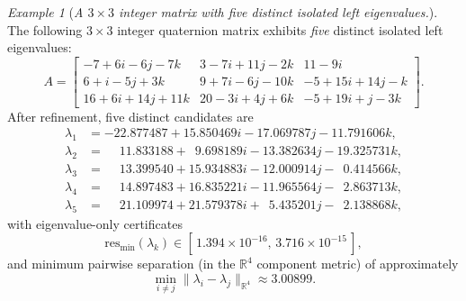 \documentclass[preprint,12pt]{elsarticle}  %
\theoremstyle{definition}
\theoremstyle{definition}
\theoremstyle{definition}
\theoremstyle{definition}
\theoremstyle{definition}
\theoremstyle{remark}
\theoremstyle{remark}
\newtheorem{Ex}{Example}
\theoremstyle{remark}
\DeclareRobustCommand{\i}{\ensuremath{\mathbf{i}}}
\DeclareRobustCommand{\j}{\ensuremath{\mathbf{j}}}
\DeclareRobustCommand{\k}{\ensuremath{\mathbf{k}}}
\def\i{i}\def\j{j}\def\k{k}%
\newcommand{\RR}{\mathbb{R}}
\begin{document}
\begin{Ex}[\emph{A $3\times3$ integer matrix with five distinct isolated left eigenvalues.}]
\label{ex:byprod_3x3_five}
The following $3\times3$ integer quaternion matrix exhibits \emph{five} distinct isolated left eigenvalues:
\[
A=
\begin{bmatrix}
-7 + 6\i - 6\j - 7\k & 3 - 7\i + 11\j - 2\k & 11 - 9\i \\
6 + \i - 5\j + 3\k & 9 + 7\i - 6\j - 10\k & -5 + 15\i + 14\j - \k\\
16 + 6\i + 14\j + 11\k & 20 - 3\i + 4\j + 6\k & -5 + 19\i + \j - 3\k
\end{bmatrix}.
\]
After refinement, five distinct candidates are
\[
\begin{aligned}
\lambda_1 &= -22.877487 + 15.850469\i - 17.069787\j - 11.791606\k,\\
\lambda_2 &= \phantom{-}11.833188 + \phantom{0}9.698189\i - 13.382634\j - 19.325731\k,\\
\lambda_3 &= \phantom{-}13.399540 + 15.934883\i - 12.000914\j - \phantom{0}0.414566\k,\\
\lambda_4 &= \phantom{-}14.897483 + 16.835221\i - 11.965564\j - \phantom{0}2.863713\k,\\
\lambda_5 &= \phantom{-}21.109974 + 21.579378\i + \phantom{0}5.435201\j - \phantom{0}2.138868\k,
\end{aligned}
\]
with eigenvalue-only certificates
\[
\mathrm{res}_{\min}(\lambda_k)\in[\,1.394\times10^{-16},\,3.716\times10^{-15}\,],
\]
and minimum pairwise separation (in the $\RR^4$ component metric) of approximately
\[
\min_{i\neq j}\|\lambda_i-\lambda_j\|_{\RR^4}\approx 3.00899.
\]
\end{Ex}
\end{document}
